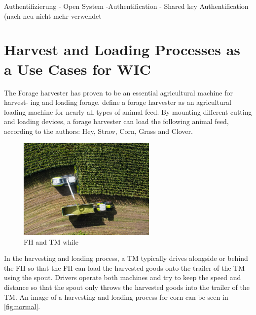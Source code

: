 \documentclass[]{nsm-thesis}
\begin{document}
Authentifizierung
- Open System -Authentification
- Shared key Authentification
(nach neu nicht mehr verwendet

\section{Harvest and Loading Processes as a Use Cases for \ac{WIC}}
The Forage harvester has proven to be an essential agricultural machine for harvest-
ing and loading forage. \textcite{seifert_feldhacksler_1962} define a forage harvester
as an agricultural loading machine for nearly all types of animal feed. By mounting different cutting and loading devices, a forage harvester can load the following animal feed, according to the authors: Hey, Straw, Corn, Grass and Clover.

\begin{figure}%
	\centering
	\includegraphics[width=0.6\textwidth]{figures/claas_harvest_side.png}
	\caption{\ac{FH} and \ac{TM} while }%
	\label{fig:normal}%
\end{figure}

In the harvesting and loading process, a \ac{TM} typically drives alongside or behind the \ac{FH} so that the \ac{FH} can load the harvested goods onto the trailer of the \ac{TM} using the spout. Drivers operate both machines and try to keep the speed and distance so that the spout only throws the harvested goods into the trailer of the TM. An image of a harvesting and loading process for corn can be seen in \autoref{fig:normal}.
\end{document}
